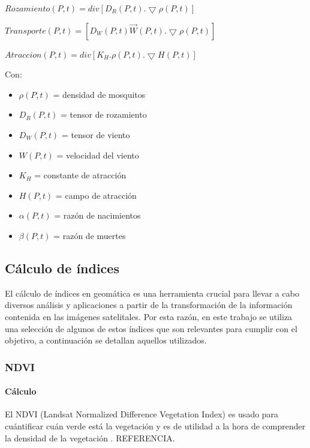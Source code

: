 $Rozamiento(P,t)=div[D_R (P,t) . \bigtriangledown \rho (P,t)]$

$Transporte(P,t)=[D_W (P,t) \vec{W} (P,t) . \bigtriangledown \rho (P,t)]$

$Atraccion(P,t) = div[K_H . \rho (P,t) . \bigtriangledown H (P,t)]$

\singlespacing

Con:

\begin{itemize}
	\item $\rho (P,t)$ = densidad de mosquitos
	\item $D_R (P,t)$ = tensor de rozamiento
	\item $D_W (P,t)$ = tensor de viento
	\item $W (P,t)$ = velocidad del viento
	\item $K_H$ = constante de atracción
	\item $H(P,t)$ = campo de atracción
	\item $\alpha (P,t)$ = razón de nacimientos
	\item $\beta (P,t)$ = razón de muertes
\end{itemize}

\subsection{Cálculo de índices}

El cálculo de índices en geomática es una herramienta crucial para llevar a cabo diversos análisis y aplicaciones a partir de la transformación de la información contenida en las imágenes satelitales. Por esta razón, en este trabajo se utiliza una selección de algunos de estos índices que son relevantes para cumplir con el objetivo, a continuación se detallan aquellos utilizados.

\subsubsection{NDVI} \label{ndvi}

\paragraph{Cálculo}

El NDVI (Landsat Normalized Difference Vegetation Index) es usado para cuántificar cuán verde está la vegetación y es de utilidad a la hora de comprender la densidad de la vegetación . REFERENCIA.

